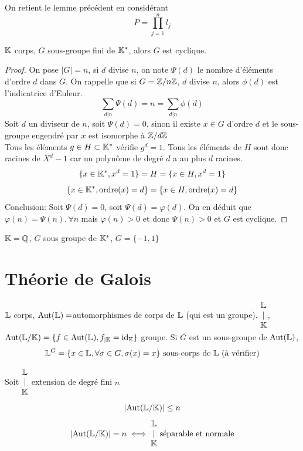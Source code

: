 \documentclass[]{report}
\begin{document}
    \begin{re}{}{}
        On retient le lemme précédent en considérant
        \[P=\prod_{j=1}^{n}l_j\]        
    \end{re}
    
    \begin{tm}{}{}
        $\mathbb{K}$ corps, $G$ sous-groupe fini de $\mathbb{K}^*$, alors $G$ est cyclique.
    \end{tm}

    \begin{proof}
        On pose $|G|=n$, si $d$ divise $n$, on note $\Psi(d)$ le nombre d'éléments d'ordre $d$ dans $G$. On rappelle que si $G=\mathbb{Z}/n\mathbb{Z}$, $d$ divise $n$, alors $\phi(d)$ est l'indicatrice d'Euleur.
        \[\sum_{d|n}\Psi(d)=n=\sum_{d|n} \phi(d)\]
        Soit $d$ un diviseur de $n$, soit $\Psi(d)=0$, sinon il existe $x\in G$ d'ordre $d$ et le sous-groupe engendré par $x$ est isomorphe à $\mathbb{Z}/d\mathbb{Z}$\\
        Tous les éléments $g\in H\subset \mathbb{K}^*$ vérifie $g^d=1$. Tous les éléments de $H$ sont donc racines de $X^d-1$ car un polynôme de degré $d$ a au plus $d$ racines.
        \[\{x\in \mathbb{K}^*,x^d=1\}=H=\{x\in H, x^d=1\}\]
        \[\{x\in \mathbb{K}^*, \text{ordre($x$)}=d\}=\{x\in H, \text{ordre($x$)}=d\}\]
        Conclusion: Soit $\Psi(d)=0$, soit $\Psi(d)=\varphi(d)$. On en déduit que $\varphi(n)=\Psi(n),\forall n$ mais $\varphi(n)>0$ et donc $\Psi(n)>0$ et $G$ est cyclique.
    \end{proof}

    \begin{ex}{}{}
        $\mathbb{K}=\mathbb{Q}$, $G$ sous groupe de $\mathbb{K}^*$, $G=\{-1,1\}$
    \end{ex}

    \chapter{Théorie de Galois}

    $\mathbb{L}$ corps, $\text{Aut}(\mathbb{L})=$automorphismes de corps de $\mathbb{L}$ (qui est un groupe). $\begin{matrix} \mathbb{L}\\ |\\ \mathbb{K} \end{matrix}$, $\text{Aut}(\mathbb{L}/\mathbb{K})=\{f\in \text{Aut}(\mathbb{L}),f_{|\mathbb{K}}=\text{id}_{\mathbb{K}}\}$ groupe. Si $G$ est un sous-groupe de $\text{Aut}(\mathbb{L})$, 
    \[\mathbb{L}^G=\{x\in \mathbb{L},\forall \sigma\in G,\sigma(x)=x\}\text{ sous-corps de $\mathbb{L}$ (à vérifier)}\]

    \begin{prop}{}{}
        Soit $\begin{matrix} \mathbb{L}\\ |\\ \mathbb{K} \end{matrix}$ extension de degré fini $n$
        \[\left| \text{Aut}(\mathbb{L}/\mathbb{K})\right|\le n\]
        \[|\text{Aut}(\mathbb{L}/\mathbb{K})|=n \iff \begin{matrix} \mathbb{L}\\ |\\ \mathbb{K} \end{matrix}\text{ séparable et normale}\]
    \end{prop}
\end{document}
